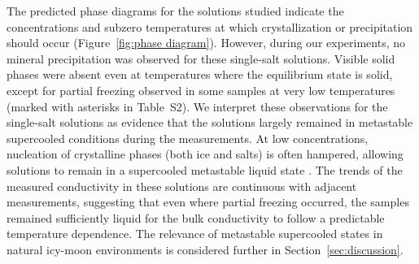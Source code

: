 \documentclass[journal=aesccq,manuscript=article]{achemso}
\begin{document}

The predicted phase diagrams for the solutions studied indicate the concentrations and subzero temperatures at which crystallization or precipitation should occur (Figure~\ref{fig:phase diagram}). 
However, during our experiments, no mineral precipitation was observed for these single-salt solutions. Visible solid phases were absent even at temperatures where the equilibrium state is solid, except for partial freezing observed in some samples at very low temperatures (marked with asterisks in Table~S2). 
We interpret these observations for the single-salt solutions as evidence that the solutions largely remained in metastable supercooled conditions during the measurements. 
At low concentrations, nucleation of crystalline phases (both ice and salts) is often hampered, allowing solutions to remain in a supercooled metastable liquid state \cite{marion2005effects}. 
The trends of the measured conductivity in these solutions are continuous with adjacent measurements, suggesting that even where partial freezing occurred, the samples remained sufficiently liquid for the bulk conductivity to follow a predictable temperature dependence. 
The relevance of metastable supercooled states in natural icy-moon environments is considered further in Section~\ref{sec:discussion}.
\end{document}
